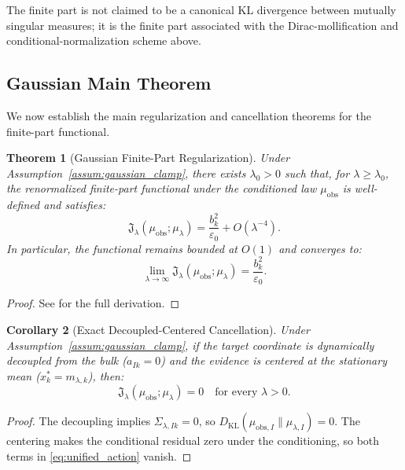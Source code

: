 \documentclass[11pt]{amsart}
\theoremstyle{plain}
\newtheorem{theorem}{Theorem}
\newtheorem{corollary}[theorem]{Corollary}
\theoremstyle{definition}
\theoremstyle{remark}
\newcommand{\KL}{D_{\operatorname{KL}}}
\begin{document}
    The finite part is not claimed to be a canonical KL divergence between mutually singular measures; it is the finite part associated with the Dirac-mollification and conditional-normalization scheme above.

    \subsection{Gaussian Main Theorem}
    \label{sec:gaussian:theorem}

    We now establish the main regularization and cancellation theorems for the finite-part functional.

    \begin{theorem}[Gaussian Finite-Part Regularization]
        \label{thm:finite_part_regularization}
        Under Assumption~\ref{assum:gaussian_clamp}, there exists $\lambda_0>0$ such that, for $\lambda\ge\lambda_0$, the renormalized finite-part functional under the conditioned law $\mu_{\mathrm{obs}}$ is well-defined and satisfies:
        \begin{equation}
            \label{eq:unified_regularization}
            \mathfrak{J}_\lambda(\mu_{\mathrm{obs}}; \mu_\lambda) = \frac{b_k^2}{\varepsilon_0} + O(\lambda^{-4}).
        \end{equation}
        In particular, the functional remains bounded at $O(1)$ and converges to:
        \begin{equation}
            \lim_{\lambda\to\infty} \mathfrak{J}_\lambda(\mu_{\mathrm{obs}}; \mu_\lambda) = \frac{b_k^2}{\varepsilon_0}.
        \end{equation}
    \end{theorem}
    \begin{proof}
        See  for the full derivation.
    \end{proof}

    \begin{corollary}[Exact Decoupled-Centered Cancellation]
        \label{cor:exact_pole_zero}
        Under Assumption~\ref{assum:gaussian_clamp}, if the target coordinate is dynamically decoupled from the bulk ($a_{Ik} = 0$) and the evidence is centered at the stationary mean ($x_k^* = m_{\lambda,k}$), then:
        \begin{equation}
            \mathfrak{J}_\lambda(\mu_{\mathrm{obs}}; \mu_\lambda) = 0 \quad \text{for every } \lambda > 0.
        \end{equation}
    \end{corollary}
    \begin{proof}
        The decoupling implies $\Sigma_{\lambda,Ik} = 0$, so $\KL(\mu_{\text{obs},I} \parallel \mu_{\lambda,I}) = 0$. The centering makes the conditional residual zero under the conditioning, so both terms in \eqref{eq:unified_action} vanish.
    \end{proof}
\end{document}
